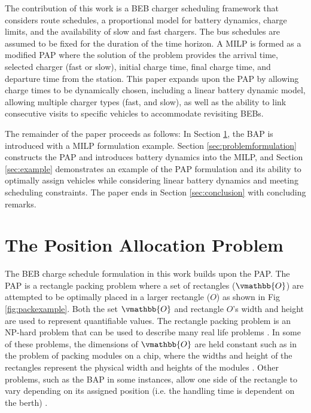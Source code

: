 \documentclass[letterpaper, 10pt, conference]{IEEEtran}
\begin{document}
The contribution of this work is a BEB charger scheduling framework that considers route schedules, a proportional model
for battery dynamics, charge limits, and the availability of slow and fast chargers. The bus schedules are assumed to be
fixed for the duration of the time horizon. A MILP is formed as a modified PAP \cite{Qarebagh2019} where the solution of
the problem provides the arrival time, selected charger (fast or slow), initial charge time, final charge time, and
departure time from the station. This paper expands upon the PAP by allowing charge times to be dynamically chosen,
including a linear battery dynamic model, allowing multiple charger types (fast, and slow), as well as the ability to
link consecutive visits to specific vehicles to accommodate revisiting BEBs.



The remainder of the paper proceeds as follows: In Section \ref{sec:positionallocationproblem}, the BAP is introduced
with a MILP formulation example. Section \ref{sec:problemformulation} constructs the PAP and introduces battery dynamics
into the MILP, and Section \ref{sec:example} demonstrates an example of the PAP formulation and its ability to optimally
assign vehicles while considering linear battery dynamics and meeting scheduling constraints. The paper ends in Section
\ref{sec:conclusion} with concluding remarks.



\section{The Position Allocation Problem}
\label{sec:positionallocationproblem}
The BEB charge schedule formulation in this work builds upon the PAP. The PAP is a rectangle packing problem where a set
of rectangles ($\vmathbb{O}$) are attempted to be optimally placed in a larger rectangle ($O$) as shown in Fig
\ref{fig:packexample}. Both the set $\vmathbb{O}$ and rectangle $O$'s width and height are used to represent
quantifiable values. The rectangle packing problem is an NP-hard problem that can be used to describe many real life
problems \cite{Bruin2013,Murata1995}. In some of these problems, the dimensions of $\vmathbb{O}$ are held constant such
as in the problem of packing modules on a chip, where the widths and height of the rectangles represent the physical
width and heights of the modules \cite{Murata1995}. Other problems, such as the BAP in some instances, allow one side of
the rectangle to vary depending on its assigned position (i.e. the handling time is dependent on the berth)
\cite{Buhrkal2010}.
\end{document}
